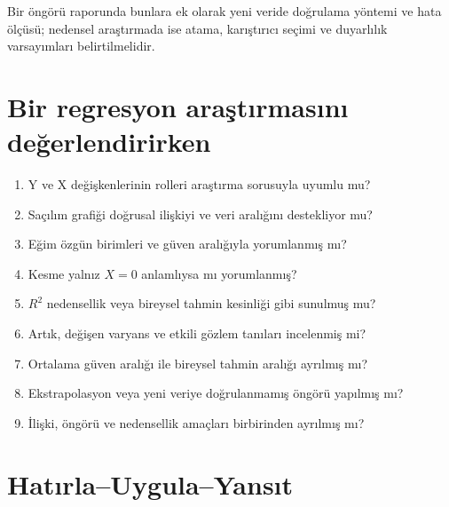 Bir öngörü raporunda bunlara ek olarak yeni veride doğrulama yöntemi ve hata
ölçüsü; nedensel araştırmada ise atama, karıştırıcı seçimi ve duyarlılık
varsayımları belirtilmelidir.

\section{Bir regresyon araştırmasını değerlendirirken}

\begin{enumerate}
  \item Y ve X değişkenlerinin rolleri araştırma sorusuyla uyumlu mu?
  \item Saçılım grafiği doğrusal ilişkiyi ve veri aralığını destekliyor mu?
  \item Eğim özgün birimleri ve güven aralığıyla yorumlanmış mı?
  \item Kesme yalnız $X=0$ anlamlıysa mı yorumlanmış?
  \item $R^2$ nedensellik veya bireysel tahmin kesinliği gibi sunulmuş mu?
  \item Artık, değişen varyans ve etkili gözlem tanıları incelenmiş mi?
  \item Ortalama güven aralığı ile bireysel tahmin aralığı ayrılmış mı?
  \item Ekstrapolasyon veya yeni veriye doğrulanmamış öngörü yapılmış mı?
  \item İlişki, öngörü ve nedensellik amaçları birbirinden ayrılmış mı?
\end{enumerate}





\section*{Hatırla--Uygula--Yansıt}

